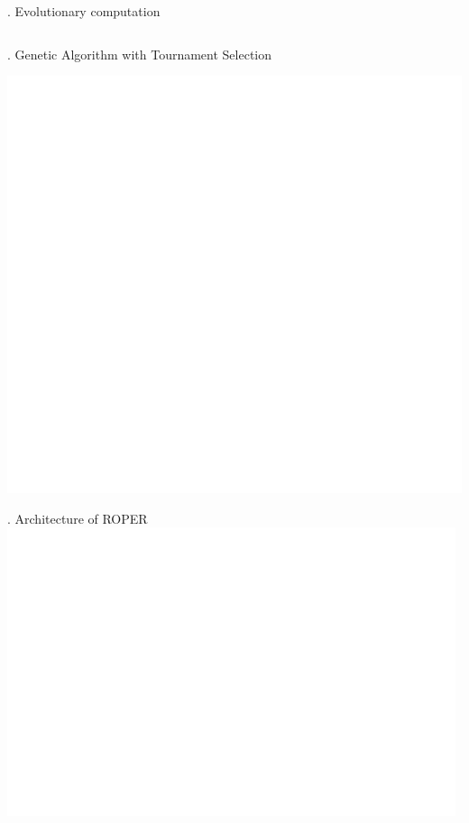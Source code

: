 \documentclass[9pt]{beamer}
\begin{document}
\begin{frame}{\theframenumber. Evolutionary computation}
  \begin{columns}
   
    \begin{column}{.5\textwidth}

    \end{column}
    \begin{column}{.5\textwidth}

    \end{column}
  \end{columns}
\end{frame}

\begin{frame}{\theframenumber. Genetic Algorithm with Tournament Selection}
  \begin{center}
  \includegraphics[height=.85\textheight,width=\textwidth]{../images/tournament.png}
  \end{center}
\end{frame}

\begin{frame}{\theframenumber. Architecture of ROPER}
      \includegraphics[width=\textwidth]{../images/architecture-transparent.png}
\end{frame}
\end{document}
